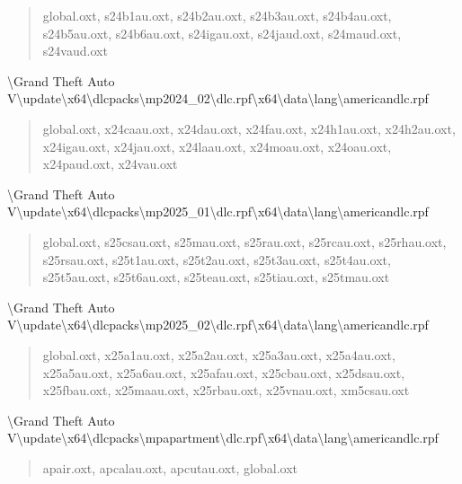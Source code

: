 \documentclass[]{scrartcl}
\begin{document}
\begin{quote}
   \ttfamily
   global.oxt, s24b1au.oxt, s24b2au.oxt, s24b3au.oxt, s24b4au.oxt, s24b5au.oxt, s24b6au.oxt, s24igau.oxt, s24jaud.oxt, s24maud.oxt, s24vaud.oxt
\end{quote}

\textbackslash{}Grand Theft Auto V\textbackslash{}update\textbackslash{}x64\textbackslash{}dlcpacks\textbackslash{}mp2024\_02\textbackslash{}dlc.rpf\textbackslash{}x64\textbackslash{}data\textbackslash{}lang\textbackslash{}americandlc.rpf

\begin{quote}
   \ttfamily
   global.oxt, x24caau.oxt, x24dau.oxt, x24fau.oxt, x24h1au.oxt, x24h2au.oxt, x24igau.oxt, x24jau.oxt, x24laau.oxt, x24moau.oxt, x24oau.oxt, x24paud.oxt, x24vau.oxt
\end{quote}

\textbackslash{}Grand Theft Auto V\textbackslash{}update\textbackslash{}x64\textbackslash{}dlcpacks\textbackslash{}mp2025\_01\textbackslash{}dlc.rpf\textbackslash{}x64\textbackslash{}data\textbackslash{}lang\textbackslash{}americandlc.rpf

\begin{quote}
   \ttfamily
   global.oxt, s25csau.oxt, s25mau.oxt, s25rau.oxt, s25rcau.oxt, s25rhau.oxt, s25rsau.oxt, s25t1au.oxt, s25t2au.oxt, s25t3au.oxt, s25t4au.oxt, s25t5au.oxt, s25t6au.oxt, s25teau.oxt, s25tiau.oxt, s25tmau.oxt
\end{quote}

\textbackslash{}Grand Theft Auto V\textbackslash{}update\textbackslash{}x64\textbackslash{}dlcpacks\textbackslash{}mp2025\_02\textbackslash{}dlc.rpf\textbackslash{}x64\textbackslash{}data\textbackslash{}lang\textbackslash{}americandlc.rpf

\begin{quote}
   \ttfamily
   global.oxt, x25a1au.oxt, x25a2au.oxt, x25a3au.oxt, x25a4au.oxt, x25a5au.oxt, x25a6au.oxt, x25afau.oxt, x25cbau.oxt, x25dsau.oxt, x25fbau.oxt, x25maau.oxt, x25rbau.oxt, x25vnau.oxt, xm5csau.oxt
\end{quote}

\textbackslash{}Grand Theft Auto V\textbackslash{}update\textbackslash{}x64\textbackslash{}dlcpacks\textbackslash{}mpapartment\textbackslash{}dlc.rpf\textbackslash{}x64\textbackslash{}data\textbackslash{}lang\textbackslash{}americandlc.rpf

\begin{quote}
   \ttfamily
   apair.oxt, apcalau.oxt, apcutau.oxt, global.oxt
\end{quote}
\end{document}
